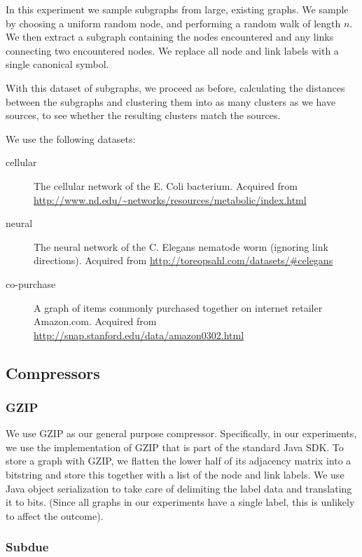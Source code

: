 \documentclass{article}
\begin{document}
In this experiment we sample subgraphs from large, existing graphs. We sample by choosing a uniform random node, and performing a random walk of length $n$. We then extract a subgraph containing the nodes encountered and any links connecting two encountered nodes. We replace all node  and link labels with a single canonical symbol.

With this dataset of subgraphs, we proceed as before, calculating the distances between the subgraphs and clustering them into as many clusters as we have sources, to see whether the resulting clusters match the sources.

We use the following datasets:
\begin{description}
	\item[cellular] The cellular network of the E. Coli bacterium. \cite{jeong2000large} Acquired from \url{http://www.nd.edu/~networks/resources/metabolic/index.html}
	\item[neural] The neural network of the C. Elegans nematode worm (ignoring link directions). \cite{achacoso1991ay,watts1998small} Acquired from \url{http://toreopsahl.com/datasets/#celegans}
	\item[co-purchase] A graph of items commonly purchased together on internet retailer Amazon.com. \cite{leskovec2007dynamics} Acquired from \url{http://snap.stanford.edu/data/amazon0302.html}
\end{description}

\subsection*{Compressors}

\subsubsection*{GZIP}

We use GZIP as our general purpose compressor. Specifically, in our experiments, we use the implementation of GZIP that is part of the standard Java SDK. To store a graph with GZIP, we flatten the lower half of its adjacency matrix into a bitstring and store this together with a list of the node and link labels. We use Java object serialization to take care of delimiting the label data and translating it to bits. (Since all graphs in our experiments have a single label, this is unlikely to affect the outcome).

\subsubsection*{Subdue}
\end{document}
